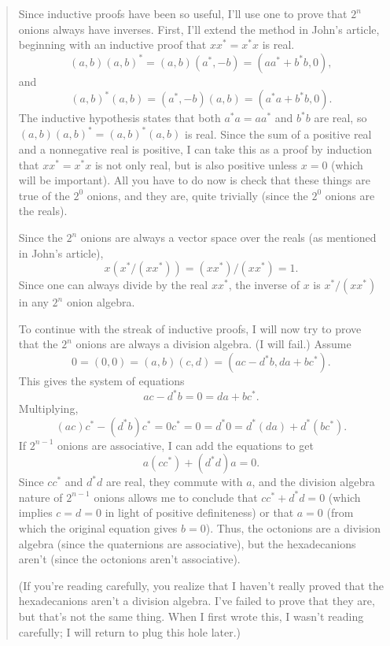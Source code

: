\documentclass{article}
\begin{document}
\begin{quote}
Since inductive proofs have been so useful, I'll use one to prove that
\(2^n\) onions always have inverses. First, I'll extend the method in
John's article, beginning with an inductive proof that \(x x^* = x^* x\)
is real. \[(a, b) (a, b)^* = (a, b) (a^*, -b) = (a a^* + b^* b, 0),\]
and \[(a, b)^* (a, b) = (a^*, -b) (a, b) = (a^* a + b^* b, 0).\] The
inductive hypothesis states that both \(a^* a = a a^*\) and \(b^* b\)
are real, so \((a, b) (a, b)^* = (a, b)^* (a, b)\) is real. Since the
sum of a positive real and a nonnegative real is positive, I can take
this as a proof by induction that \(x x^* = x^* x\) is not only real,
but is also positive unless \(x = 0\) (which will be important). All you
have to do now is check that these things are true of the \(2^0\)
onions, and they are, quite trivially (since the \(2^0\) onions are the
reals).

Since the \(2^n\) onions are always a vector space over the reals (as
mentioned in John's article),
\[x (x^* / (x x^*)) = (x x^*) / (x x^*) = 1.\] Since one can always
divide by the real \(x x^*\), the inverse of \(x\) is \(x^* / (x x^*)\)
in any \(2^n\) onion algebra.

To continue with the streak of inductive proofs, I will now try to prove
that the \(2^n\) onions are always a division algebra. (I will fail.)
Assume \[0 = (0, 0) = (a, b) (c, d) = (a c - d^* b, d a + b c^*).\] This
gives the system of equations \[a c - d^* b = 0 = d a + b c^*.\]
Multiplying,
\[(a c) c^* - (d^* b) c^* = 0 c^* = 0 = d^* 0 = d^* (d a) + d^* (b c^*).\]
If \(2^{n-1}\) onions are associative, I can add the equations to get
\[a (c c^*) + (d^* d) a = 0.\] Since \(c c^*\) and \(d^* d\) are real,
they commute with \(a\), and the division algebra nature of \(2^{n-1}\)
onions allows me to conclude that \(c c^* + d^* d = 0\) (which implies
\(c = d = 0\) in light of positive definiteness) or that \(a = 0\) (from
which the original equation gives \(b = 0\)). Thus, the octonions are a
division algebra (since the quaternions are associative), but the
hexadecanions aren't (since the octonions aren't associative).

(If you're reading carefully, you realize that I haven't really proved
that the hexadecanions aren't a division algebra. I've failed to prove
that they are, but that's not the same thing. When I first wrote this, I
wasn't reading carefully; I will return to plug this hole later.)


\end{quote}
\end{document}
